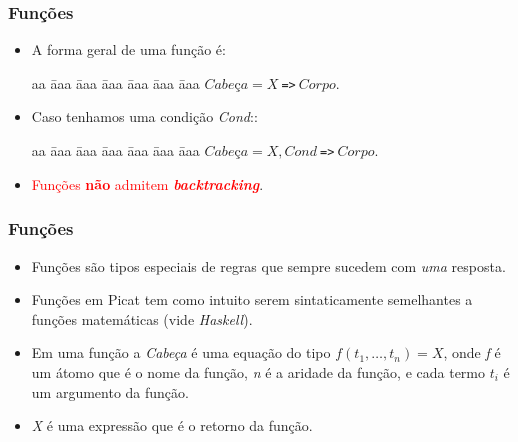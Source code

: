\begin{frame}[fragile]
	\frametitle{Funções}
    
    \begin{itemize}
        \item A forma geral de uma função é:
        
        \begin{tabbing}
          aa \= aaa \= aaa \= aaa \= aaa \= aaa \= aaa \kill
          \> \> $Cabe$ç$a = X \ $\verb+=>+$\ Corpo$. 
        \end{tabbing}

       \pause        
        \item Caso tenhamos uma condição \emph{Cond}::
        
        \begin{tabbing}
          aa \= aaa \= aaa \= aaa \= aaa \= aaa \= aaa \kill
          \> \> $Cabe$ç$a = X , Cond \ $\verb+=>+$\ Corpo$. 
        \end{tabbing}
        
        \item \textcolor{red}{Funções \textbf{não} admitem \textbf{\textit{backtracking}}}.
    \end{itemize}
\end{frame}
    
\begin{frame}[fragile]
	\frametitle{Funções}

    
    \begin{itemize}
        \item Funções são tipos especiais de regras que sempre sucedem com \emph{uma} 
        resposta.
        
        \pause
        \item Funções em Picat tem como intuito serem sintaticamente semelhantes a funções matemáticas (vide \emph{Haskell}).
        
        \pause
        \item Em uma função a \emph{Cabeça} é uma equação do tipo $f(t_1,\ldots,t_n)=X$, onde
        \emph{f} é um átomo que é o nome da função, \emph{n} é a aridade da função, e cada
        termo $t_i$ é um argumento da função.
        
        \item \emph{X} é uma expressão que é o retorno da função.
        
    \end{itemize}
    
\end{frame}
    
